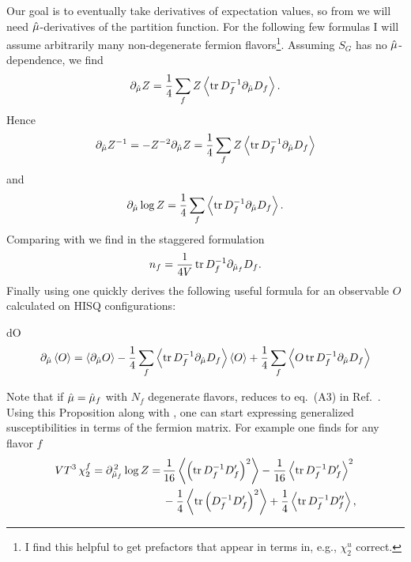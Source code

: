 Our goal is to eventually take derivatives of expectation values, so from
 we will need $\hat{\mu}$-derivatives of the partition 
function. For the following few formulas 
I will assume arbitrarily many non-degenerate
fermion flavors\footnote{I find this helpful to get prefactors that appear
in terms in, e.g., $\chi_2^u$ correct.}. Assuming $S_G$ has no 
$\hat{\mu}$-dependence, we find
\begin{equation}
  \partial_{\muh}Z = \frac{1}{4}\sum_f 
                      Z\ev{\tr D_f^{-1}\partial_{\muh}D_f}.
\end{equation}
Hence 
\begin{equation}\label{eq:dZinv}
  \partial_{\muh}Z^{-1} = -Z^{-2}\partial_{\muh}Z
                        =\frac{1}{4}\sum_fZ\ev{\tr D_f^{-1}\partial_{\muh}D_f}
\end{equation}
and
\begin{equation}\label{eq:dlogZ}
  \partial_{\muh}\log Z=\frac{1}{4}\sum_f\ev{\tr D_f^{-1}\partial_{\muh}D_f}.
\end{equation}
Comparing  with  we find in
the staggered formulation
\begin{equation}
  n_f=\frac{1}{4V}\tr D_f^{-1}\partial_{\hat{\mu}_f}D_f.
\end{equation} 
Finally using  one quickly derives the following useful formula
for an observable $O$ calculated on HISQ configurations:
\begin{proposition}{}{dO}
\begin{equation*} \partial_{\muh}\ev{O}
       =   \ev{\partial_{\muh}O}
        -\frac{1}{4}\sum_f\ev{\tr D_f^{-1}\partial_{\muh}D_f}\ev{O}
         +\frac{1}{4}\sum_f\ev{O\tr D_f^{-1}\partial_{\muh}D_f}
\end{equation*}
\end{proposition} 
Note that if $\hat{\mu}=\hat{\mu}_f$ with $N_f$ degenerate flavors, 
 reduces to eq.~(A3)
in Ref.~\cite{allton_thermodynamics_2005}. Using this Proposition along
with , one 
can start expressing generalized susceptibilities in terms of the fermion
matrix. For example one finds for any flavor $f$
\begin{equation}\begin{aligned}
  VT^3\,\chi_2^f =\partial_{\muh_f}^{\,2}\log Z
                 =\, & \frac{1}{16}\ev{\left(\tr D_f^{-1}D_f'\right)^2}
                    -\frac{1}{16}\ev{\tr D_f^{-1}D_f'}^2\\
                   & -\frac{1}{4}\ev{\tr \left(D_f^{-1} D_f'\right)^2}
                    +\frac{1}{4}\ev{\tr D_f^{-1}D_f''},
\end{aligned}\end{equation}
